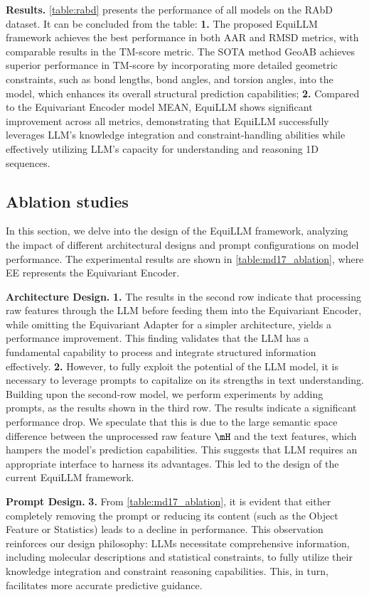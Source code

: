 \textbf{Results.}
\cref{table:rabd} presents the performance of all models on the RAbD dataset. It can be concluded from the table: \textbf{1.} The proposed EquiLLM framework achieves the best performance in both AAR and RMSD metrics, with comparable results in the TM-score metric. The SOTA method GeoAB achieves superior performance in TM-score by incorporating more detailed geometric constraints, such as bond lengths, bond angles, and torsion angles, into the model, which enhances its overall structural prediction capabilities; \textbf{2.} Compared to the Equivariant Encoder model MEAN, EquiLLM shows significant improvement across all metrics, demonstrating that EquiLLM successfully leverages LLM’s knowledge integration and constraint-handling abilities while effectively utilizing LLM’s capacity for understanding and reasoning 1D sequences.

\subsection{Ablation studies}
\label{sec:4.3}
In this section, we delve into the design of the EquiLLM framework, analyzing the impact of different architectural designs and prompt configurations on model performance. The experimental results are shown in \cref{table:md17_ablation}, where EE represents the Equivariant Encoder.

\textbf{Architecture Design.} \textbf{1.} The results in the second row indicate that processing raw features through the LLM before feeding them into the Equivariant Encoder, while omitting the Equivariant Adapter for a simpler architecture, yields a performance improvement. This finding validates that the LLM has a fundamental capability to process and integrate structured information effectively. \textbf{2.} However, to fully exploit the potential of the LLM model, it is necessary to leverage prompts to capitalize on its strengths in text understanding. Building upon the second-row model, we perform experiments by adding prompts, as the results shown in the third row. The results indicate a significant performance drop. We speculate that this is due to the large semantic space difference between the unprocessed raw feature $\mH$ and the text features, which hampers the model's prediction capabilities. This suggests that LLM requires an appropriate interface to harness its advantages. This led to the design of the current EquiLLM framework.

\textbf{Prompt Design.} \textbf{3.} From \cref{table:md17_ablation}, it is evident that either completely removing the prompt or reducing its content (such as the Object Feature or Statistics) leads to a decline in performance. This observation reinforces our design philosophy: LLMs necessitate comprehensive information, including molecular descriptions and statistical constraints, to fully utilize their knowledge integration and constraint reasoning capabilities. This, in turn, facilitates more accurate predictive guidance.
